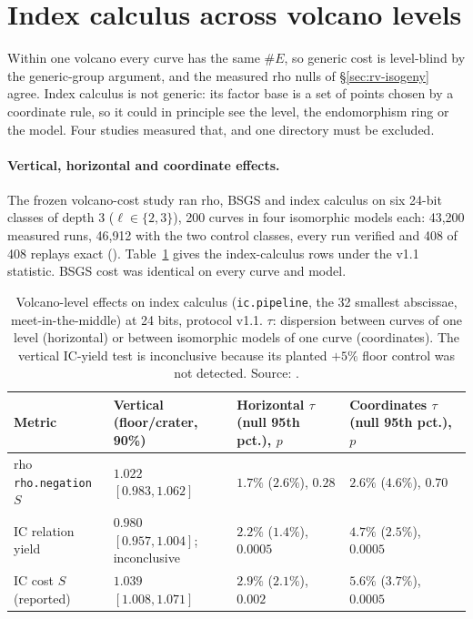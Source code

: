 \section{Index calculus across volcano levels}\label{sec:iso-volcano}

Within one volcano every curve has the same $\#E$, so generic cost is
level-blind by the generic-group argument, and the measured rho nulls of
\S\ref{sec:rv-isogeny} agree. Index calculus is not generic: its factor
base is a set of points chosen by a coordinate rule, so it could in
principle see the level, the endomorphism ring or the model. Four studies
measured that, and one directory must be excluded.

\paragraph{Vertical, horizontal and coordinate effects.} The frozen
volcano-cost study ran rho, BSGS and index calculus on six 24-bit classes
of depth 3 ($\ell\in\{2,3\}$), 200 curves in four isomorphic models each:
43{,}200 measured runs, 46{,}912 with the two control classes, every run
verified and 408 of 408 replays exact
().
Table~\ref{tab:iso-volcano-v1} gives the index-calculus rows under the
v1.1 statistic. BSGS cost was identical on every curve and model.

\begin{table}[t]
\centering\small
\begin{tabularx}{\linewidth}{@{}>{\raggedright}p{2.6cm}>{\raggedright}X>{\raggedright}X>{\raggedright\arraybackslash}X@{}}
\toprule
Metric & Vertical (floor/crater, 90\%) & Horizontal $\tau$ (null 95th pct.), $p$ & Coordinates $\tau$ (null 95th pct.), $p$ \\
\midrule
rho \texttt{rho.negation} $S$ & $1.022$ $[0.983,1.062]$ & $1.7\%$ ($2.6\%$), $0.28$ & $2.6\%$ ($4.6\%$), $0.70$ \\
IC relation yield & $0.980$ $[0.957,1.004]$; inconclusive & $2.2\%$ ($1.4\%$), $0.0005$ & $4.7\%$ ($2.5\%$), $0.0005$ \\
IC cost $S$ (reported) & $1.039$ $[1.008,1.071]$ & $2.9\%$ ($2.1\%$), $0.002$ & $5.6\%$ ($3.7\%$), $0.0005$ \\
\bottomrule
\end{tabularx}
\caption[]{Volcano-level effects on index calculus (\texttt{ic.pipeline},
the 32 smallest abscissae, meet-in-the-middle) at 24 bits, protocol v1.1.
$\tau$: dispersion between curves of one level (horizontal) or between
isomorphic models of one curve (coordinates). The vertical IC-yield test
is inconclusive because its planted $+5\%$ floor control was not detected.
Source: .}
\label{tab:iso-volcano-v1}
\end{table}

